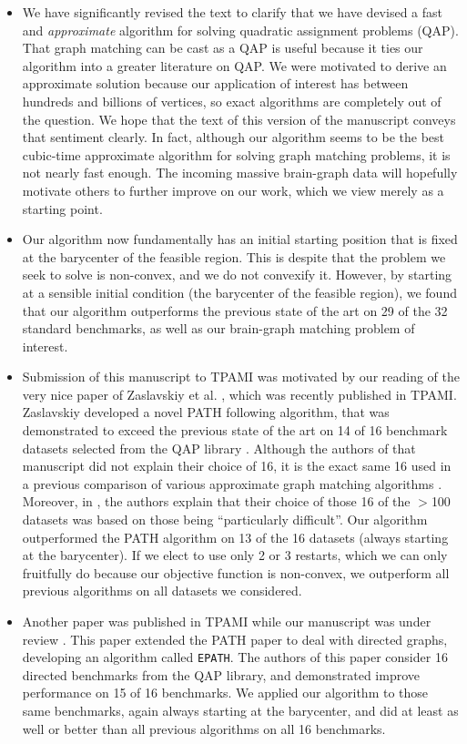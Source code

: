 \begin{itemize}
	\item  We have significantly revised the text to clarify that we have devised a fast and \emph{approximate} algorithm for solving quadratic assignment problems (QAP).  That graph matching can be cast as a QAP is useful because it ties our algorithm into a greater literature on QAP.	We were motivated to derive an approximate solution because our application of interest has between hundreds and billions of vertices, so exact algorithms are completely out of the question.  We hope that the text of this version of the manuscript conveys that sentiment clearly.  In fact, although our algorithm seems to be the best cubic-time approximate algorithm for solving graph matching problems, it is not nearly fast enough.  The incoming massive brain-graph data will hopefully motivate others to further improve on our work, which we view merely as a starting point.
	\item Our algorithm now fundamentally has an initial starting position that is fixed at the barycenter of the feasible region.  This is despite that the problem we seek to solve is non-convex, and we do not convexify it.  However, by starting at a sensible initial condition (the barycenter of the feasible region), we found that our algorithm outperforms the previous state of the art on 29 of the 32 standard benchmarks, as well as our brain-graph matching problem of interest.  
	\item Submission of this manuscript to TPAMI was motivated by our reading of the very nice paper of Zaslavskiy et al. \cite{Zaslavskiy2009}, which was recently published in TPAMI.  Zaslavskiy developed a novel PATH following algorithm, that was demonstrated to exceed the previous state of the art on 14 of 16 benchmark datasets selected from the QAP library \cite{Burkard1997}.  Although the authors of that manuscript did not explain their choice of 16, it is the exact same 16 used in a previous comparison of various approximate graph matching algorithms \cite{Schellewald2001}. Moreover, in \cite{Schellewald2001}, the authors explain that their choice of those 16 of the $>$100 datasets was based on those being ``particularly difficult''.   Our algorithm outperformed the PATH algorithm on 13 of the 16 datasets (always starting at the barycenter).  If we elect to use only 2 or 3 restarts, which we can only fruitfully do because our objective function is non-convex, we outperform all previous algorithms on all datasets we considered.
	\item Another paper was published in TPAMI while our manuscript was under review \cite{Liu2012}.  This paper extended the PATH paper to deal with directed graphs, developing an algorithm called \texttt{EPATH}.  The authors of this paper consider 16 directed benchmarks from the QAP library, and demonstrated improve performance on 15 of 16 benchmarks.  We applied our \FAQ algorithm to those same benchmarks, again always starting at the barycenter, and did at least as well or better than all previous algorithms on all 16 benchmarks.

\end{itemize}
